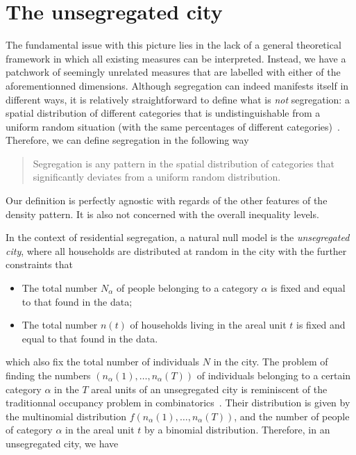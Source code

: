 \section{The unsegregated city}
\label{sec:null_model_the_unsegregated_city}

The fundamental issue with this picture lies in the lack of a general theoretical framework
in which all existing measures can be interpreted.  Instead, we have a
patchwork of seemingly unrelated measures that are labelled with
either of the aforementionned dimensions. Although segregation can
indeed manifests itself in different ways, it is relatively
straightforward to define what is \emph{not} segregation: a spatial
distribution of different categories that is undistinguishable from a
uniform random situation (with the same percentages of different
categories)~\cite{Jahn:1947}. Therefore, we can define segregation in the following way 

\begin{quote}
Segregation is any pattern in the spatial distribution of categories that significantly 
deviates from a uniform random distribution. 
\end{quote} 

Our definition is perfectly agnostic with regards of the other features of the
density pattern. It is also not concerned with the overall inequality levels. 


In the context of residential segregation, a natural null model is the
\emph{unsegregated city}, where all households are distributed at
random in the city with the further constraints that

\begin{itemize}
    \item The total number $N_\alpha$ of people belonging to a category
	    $\alpha$ is fixed and equal to that found in the data;
    \item The total number $n(t)$ of households living in the areal unit $t$ is
	    fixed and equal to that found in the data.
\end{itemize}

which also fix the total number of individuals $N$ in the city. The problem of
finding the numbers $\left( n_\alpha(1), \dots, n_\alpha(T) \right)$ of
individuals belonging to a certain category $\alpha$ in the $T$ areal units of
an unsegregated city is reminiscent of the traditionnal occupancy problem in
combinatorics~\cite{Feller:1950}. Their distribution is given by the multinomial
distribution $f \left( n_\alpha(1), \dots, n_\alpha(T) \right)$, and the number
of people of category $\alpha$ in the areal unit $t$ by a binomial distribution.
Therefore, in an unsegregated city, we have

